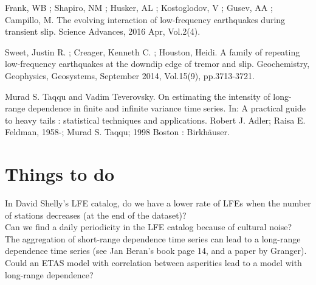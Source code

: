\documentclass[workdone.tex]{subfiles}
\begin{document}
Frank, WB ; Shapiro, NM ; Husker, AL ; Kostoglodov, V ; Gusev, AA ; Campillo, M. The evolving interaction of low-frequency earthquakes during transient slip. Science Advances, 2016 Apr, Vol.2(4).

Sweet, Justin R. ; Creager, Kenneth C. ; Houston, Heidi. A family of repeating low‐frequency earthquakes at the downdip edge of tremor and slip. Geochemistry, Geophysics, Geosystems, September 2014, Vol.15(9), pp.3713-3721.

Murad S. Taqqu and Vadim Teverovsky. On estimating the intensity of long-range dependence in finite and infinite variance time series. In: A practical guide to heavy tails : statistical techniques and applications. Robert J. Adler; Raisa E. Feldman, 1958-; Murad S. Taqqu; 1998 Boston : Birkhäuser.

\chapter{Things to do}

In David Shelly's LFE catalog, do we have a lower rate of LFEs when the number of stations decreases (at the end of the dataset)? \\

Can we find a daily periodicity in the LFE catalog because of cultural noise? \\

The aggregation of short-range dependence time series can lead to a long-range dependence time series (see Jan Beran's book page 14, and a paper by Granger). Could an ETAS model with correlation between asperities lead to a model with long-range dependence?
\end{document}
